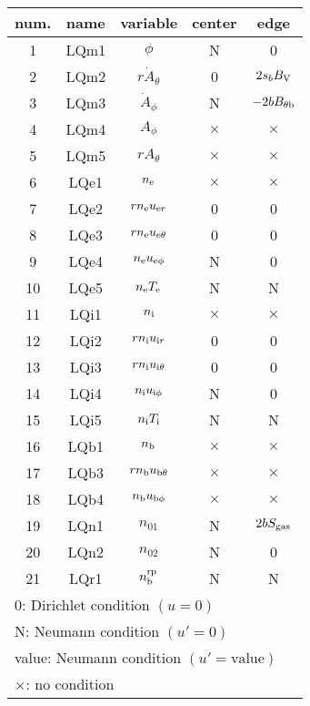 \documentclass[11pt]{article}
\def\r#1{{\rm#1}}
\def\ne{n_\r{e}}
\def\ni{n_\r{i}}
\def\nb{n_\r{b}}
\def\uer{u_{\r{e}r}}
\def\uir{u_{\r{i}r}}
\def\ueth{u_{\r{e}\theta}}
\def\uith{u_{\r{i}\theta}}
\def\ubth{u_{\r{b}\theta}}
\def\ueph{u_{\r{e}\phi}}
\def\uiph{u_{\r{i}\phi}}
\def\ubph{u_{\r{b}\phi}}
\def\Athd{\dot{A}_\theta}
\def\Aphd{\dot{A}_\phi}
\def\Ath{A_\theta}
\def\Aph{A_\phi}
\def\Te{T_\r{e}}
\def\Ti{T_\r{i}}
\def\nna{n_{01}}
\def\nnb{n_{02}}
\def\nbrp{n_\r{b}^\r{rp}}
\begin{document}
\begin{tabular}{|c|c|c|c|c|}\hline
 num. & name & variable      & center & edge \\\hline
 1    & LQm1 & $\phi$        & N        & 0\\
 2    & LQm2 & $r \Athd$     & 0        & $2s_b B_\r{V}$\\
 3    & LQm3 & $\Aphd$       & N        & $-2bB_{\theta\r{b}}$\\
 4    & LQm4 & $\Aph$        & $\times$ & $\times$\\
 5    & LQm5 & $r \Ath$      & $\times$ & $\times$\\
 6    & LQe1 & $\ne$         & $\times$ & $\times$\\
 7    & LQe2 & $r \ne \uer$  & 0        & 0\\
 8    & LQe3 & $r \ne \ueth$ & 0        & 0\\
 9    & LQe4 & $\ne \ueph$   & N        & 0\\
 10   & LQe5 & $\ne \Te$     & N        & N\\
 11   & LQi1 & $\ni$         & $\times$ & $\times$\\
 12   & LQi2 & $r \ni \uir$  & 0        & 0\\
 13   & LQi3 & $r \ni \uith$ & 0        & 0\\
 14   & LQi4 & $\ni \uiph$   & N        & 0\\
 15   & LQi5 & $\ni \Ti$     & N        & N\\
 16   & LQb1 & $\nb$         & $\times$ & $\times$\\
 17   & LQb3 & $r \nb \ubth$ & $\times$ & $\times$\\
 18   & LQb4 & $\nb \ubph$   & $\times$ & $\times$\\
 19   & LQn1 & $\nna$        & N        & $2bS_\r{gas}$\\
 20   & LQn2 & $\nnb$        & N        & 0\\
 21   & LQr1 & $\nbrp$       & N        & N\\\hline
 \multicolumn{5}{l}{0: Dirichlet condition $(u=0)$}\\
 \multicolumn{5}{l}{N: Neumann condition $(u'=0)$}\\
 \multicolumn{5}{l}{value: Neumann condition $(u'=\mbox{value})$}\\
 \multicolumn{5}{l}{$\times$: no condition}
\end{tabular}
\end{document}
